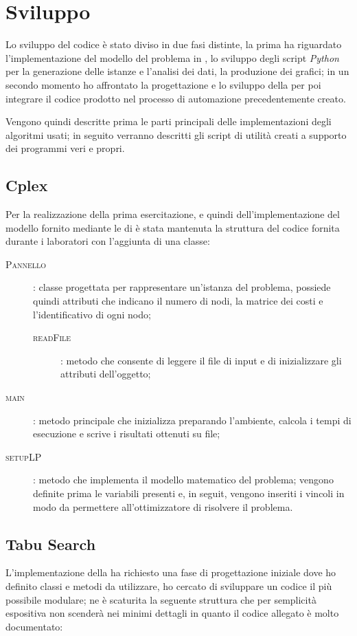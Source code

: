 \section{Sviluppo}
Lo sviluppo del codice è stato diviso in due fasi distinte, la prima ha riguardato l'implementazione del modello del problema in , lo sviluppo degli script \emph{Python} per la generazione delle istanze e l'analisi dei dati, la produzione dei grafici; in un secondo momento ho affrontato la progettazione e lo sviluppo della \tabu per poi integrare il codice prodotto nel processo di automazione precedentemente creato.

Vengono quindi descritte prima le parti principali delle implementazioni degli algoritmi usati; in seguito verranno descritti gli script di utilità creati a supporto dei programmi veri e propri.

\subsection{Cplex}
Per la realizzazione della prima esercitazione, e quindi dell'implementazione del modello fornito mediante le  di  è stata mantenuta la struttura del codice fornita durante i laboratori con l'aggiunta di una classe: 

\begin{description}
	\item[\textsc{Pannello}]: classe progettata per rappresentare un'istanza del problema, possiede quindi attributi che indicano il numero di nodi, la matrice dei costi e l'identificativo di ogni nodo;
	\begin{description}
		\item[\textsc{readFile}]: metodo che consente di leggere il file di input e di inizializzare gli attributi dell'oggetto;
	\end{description}
	\item[\textsc{main}]: metodo principale che inizializza  preparando l'ambiente, calcola i tempi di esecuzione e scrive i risultati ottenuti su file;
	\item[\textsc{setupLP}]: metodo che implementa il modello matematico del problema; vengono definite prima le variabili presenti e, in seguit, vengono inseriti i vincoli in modo da permettere all'ottimizzatore di risolvere il problema.
\end{description}

\subsection{Tabu Search}
L'implementazione della \tabu ha richiesto una fase di progettazione iniziale dove ho definito classi e metodi da utilizzare, ho cercato di sviluppare un codice il più possibile modulare; ne è scaturita la seguente struttura che per semplicità espositiva non scenderà nei minimi dettagli in quanto il codice allegato è molto documentato:

